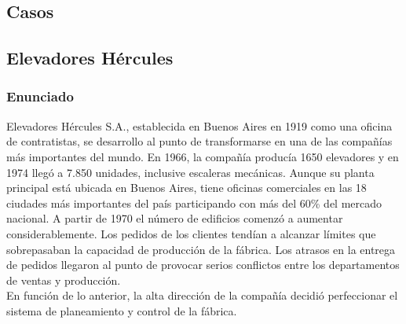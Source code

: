 \documentclass[a4paper,10pt,titlepage]{article}
\begin{document}
\pagestyle{fancy}

\tableofcontents
\newpage


\vspace*{\fill}
\begin{center}
\begingroup
\titlerule
\vspace{1cm}
\section{Casos}
\vspace{1cm}
\titlerule
\endgroup
\end{center}
\vspace*{\fill}

\subsection{Elevadores H\'ercules}
\vspace{0.5cm}
\subsubsection{Enunciado}

		\indent Elevadores H\'ercules S.A., establecida en Buenos Aires en 1919 como una oficina de contratistas, se desarrollo al punto de transformarse en una de las compa\~n\'ias m\'as importantes del mundo. En 1966, la compa\~n\'ia produc\'ia 1650 elevadores y en 1974 lleg\'o a 7.850 unidades, inclusive escaleras mec\'anicas. Aunque su planta principal est\'a ubicada en Buenos Aires, tiene oficinas comerciales en las 18 ciudades m\'as importantes del pa\'is participando con m\'as del 60\% del mercado nacional. A partir de 1970 el n\'umero de edificios comenz\'o a aumentar considerablemente. Los pedidos de los clientes tend\'ian a alcanzar l\'imites que sobrepasaban la capacidad de producci\'on de la f\'abrica. Los atrasos en la entrega de pedidos llegaron al punto de provocar serios conflictos entre los departamentos de ventas y producci\'on.\\
		\indent En funci\'on de lo anterior, la alta direcci\'on de la compa\~n\'ia decidi\'o perfeccionar el sistema de planeamiento y control de la f\'abrica.\\ \\
 
\end{document}
